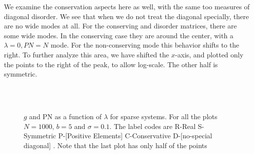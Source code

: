 \documentclass[onecolumn,fleqn]{revtex4}
\begin{document}
We examine the conservation aspects here as well, with the same
too measures of diagonal disorder. We see that when we do not treat the diagonal
specially, there are no wide modes at all. For the conserving and disorder matrices,
there are some wide modes. In the conserving case they are around the center, with a $\lambda=0, PN=N$ mode.
For the non-conserving mode this behavior shifts to the right. To further
analyze this area, we have shifted the $x$-axis, and plotted only the points to the 
right of the peak, to allow log-scale. The other half is symmetric. 
\begin{figure}[H]
  \\
  \\
  \caption{$g$ and PN as a function of $\lambda$ for sparse systems.
  For all the plots $N=1000$, $b=5$ and $\sigma=0.1$. 
  The label codes are R-Real S-Symmetric P-[Positive Elements] C-Conservative D-[no-special diagonal] . Note
  that the last plot has only half of the points}
  \label{fig:pta_sym2}
\end{figure}
\end{document}
